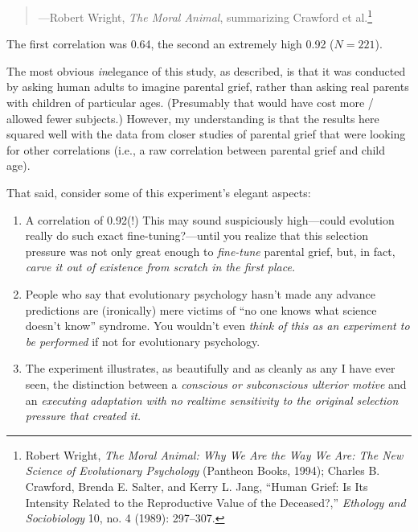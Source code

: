 {\begin{quote}
{\raggedleft
 {}---Robert Wright, \textit{The Moral Animal},\newline
 summarizing Crawford et al.\footnote{Robert Wright, \textit{The Moral Animal: Why We Are the Way We
Are: The New Science of Evolutionary Psychology} (Pantheon Books,
1994); Charles B. Crawford, Brenda E. Salter, and Kerry L. Jang,
``Human Grief: Is Its Intensity Related to the
Reproductive Value of the Deceased?,''
\textit{Ethology and Sociobiology} 10, no. 4 (1989): 297--307.}
\par}
\end{quote}


{
 The first correlation was 0.64, the second an extremely high 0.92
($N = 221$).}

{
 The most obvious \textit{in}elegance of this study, as described,
is that it was conducted by asking human adults to imagine parental
grief, rather than asking real parents with children of particular
ages. (Presumably that would have cost more / allowed fewer subjects.)
However, my understanding is that the results here squared well with
the data from closer studies of parental grief that were looking for
other correlations (i.e., a raw correlation between parental grief and
child age).}

{
 That said, consider some of this experiment's
elegant aspects:}

\begin{enumerate}
\item {
 A correlation of 0.92(!) This may sound suspiciously high---could
evolution really do such exact fine-tuning?---until you realize that
this selection pressure was not only great enough to \textit{fine-tune}
parental grief, but, in fact, \textit{carve it out of existence from
scratch in the first place.}}

\item {
 People who say that evolutionary psychology hasn't
made any advance predictions are (ironically) mere victims of
``no one knows what science doesn't
know'' syndrome. You wouldn't even
\textit{think of this as an experiment to be performed} if not for
evolutionary psychology.}

\item {
 The experiment illustrates, as beautifully and as cleanly as any I
have ever seen, the distinction between a \textit{conscious or
subconscious ulterior motive} and an \textit{executing adaptation with
no realtime sensitivity to the original selection pressure that created
it.}}


\end{enumerate}}

